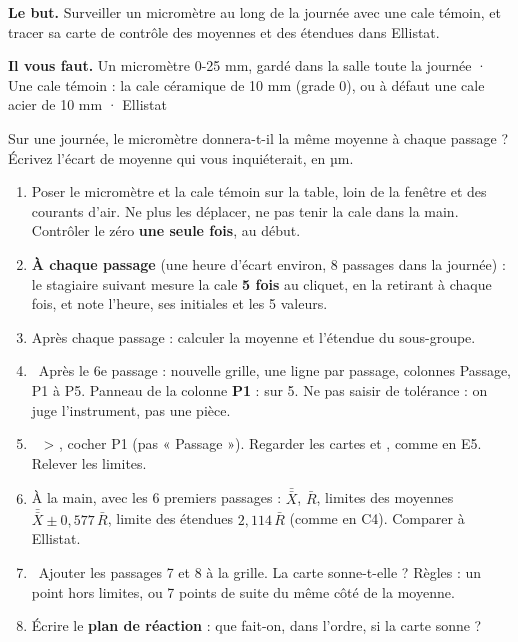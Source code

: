 \documentclass[10pt,a4paper]{article}
\begin{document}
\thispagestyle{fancy}
\begin{tcolorbox}[boite]\textbf{Le but.} Surveiller un micromètre au long de la journée avec une cale témoin, et tracer sa carte de contrôle des moyennes et des étendues dans Ellistat.\par\textbf{Il vous faut.} Un micromètre 0-25 mm, gardé dans la salle toute la journée · Une cale témoin : la cale céramique de 10 mm (grade 0), ou à défaut une cale acier de 10 mm · Ellistat\end{tcolorbox}
\begin{tcolorbox}[pred]Sur une journée, le micromètre donnera-t-il la même moyenne à chaque passage ? Écrivez l'écart de moyenne qui vous inquiéterait, en µm.\reponse\end{tcolorbox}
\begin{enumerate}[label=\textcolor{cyan}{\textbf{\arabic*.}},leftmargin=15pt,itemsep=1.5pt]
\item Poser le micromètre et la cale témoin sur la table, loin de la fenêtre et des courants d'air. Ne plus les déplacer, ne pas tenir la cale dans la main. Contrôler le zéro \textbf{une seule fois}, au début.
\item \textbf{À chaque passage} (une heure d'écart environ, 8 passages dans la journée) : le stagiaire suivant mesure la cale \textbf{5 fois} au cliquet, en la retirant à chaque fois, et note l'heure, ses initiales et les 5 valeurs.
\item Après chaque passage : calculer la moyenne et l'étendue du sous-groupe.
\item \tagE\ Après le 6e passage : nouvelle grille, une ligne par passage, colonnes Passage, P1 à P5. Panneau de la colonne \textbf{P1} :  sur 5. Ne pas saisir de tolérance : on juge l'instrument, pas une pièce.
\item \tagE\  > , cocher P1 (pas « Passage »). Regarder les cartes  et , comme en E5. Relever les limites.
\item À la main, avec les 6 premiers passages : $\bar{\bar X}$, $\bar R$, limites des moyennes $\bar{\bar X} \pm 0{,}577\,\bar R$, limite des étendues $2{,}114\,\bar R$ (comme en C4). Comparer à Ellistat.
\item \tagE\ Ajouter les passages 7 et 8 à la grille. La carte sonne-t-elle ? Règles : un point hors limites, ou 7 points de suite du même côté de la moyenne.
\item Écrire le \textbf{plan de réaction} : que fait-on, dans l'ordre, si la carte sonne ?
\end{enumerate}
\end{document}
